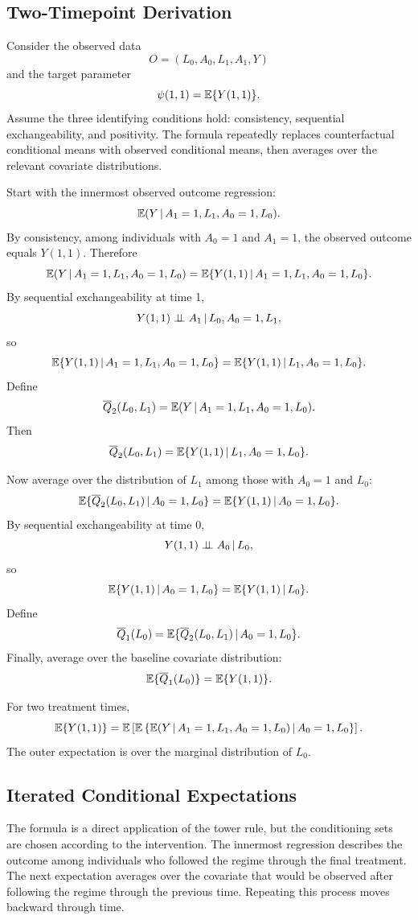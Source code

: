 \label{lec:8-3}

\subsection{Two-Timepoint Derivation}

Consider the observed data
\[
  O=(L_0,A_0,L_1,A_1,Y)
\]
and the target parameter
\[
  \psi(1,1)=\mathbb{E}\{Y(1,1)\}.
\]
Assume the three identifying conditions hold: consistency, sequential
exchangeability, and positivity. The formula repeatedly replaces counterfactual
conditional means with observed conditional means, then averages over the
relevant covariate distributions.

Start with the innermost observed outcome regression:
\[
  \mathbb{E}(Y\,\vert\, A_1=1,L_1,A_0=1,L_0).
\]
By consistency, among individuals with $A_0=1$ and $A_1=1$, the observed outcome
equals $Y(1,1)$. Therefore
\[
  \mathbb{E}(Y\,\vert\, A_1=1,L_1,A_0=1,L_0)
  =
  \mathbb{E}\{Y(1,1)\,\vert\, A_1=1,L_1,A_0=1,L_0\}.
\]
By sequential exchangeability at time 1,
\[
  Y(1,1)\perp\!\!\!\perp A_1\,\vert\, L_0,A_0=1,L_1,
\]
so
\[
  \mathbb{E}\{Y(1,1)\,\vert\, A_1=1,L_1,A_0=1,L_0\}
  =
  \mathbb{E}\{Y(1,1)\,\vert\, L_1,A_0=1,L_0\}.
\]
Define
\[
  \overline{Q}_2(L_0,L_1)
  =
  \mathbb{E}(Y\,\vert\, A_1=1,L_1,A_0=1,L_0).
\]
Then
\[
  \overline{Q}_2(L_0,L_1)
  =
  \mathbb{E}\{Y(1,1)\,\vert\, L_1,A_0=1,L_0\}.
\]

Now average over the distribution of $L_1$ among those with $A_0=1$ and $L_0$:
\[
  \mathbb{E}\{\overline{Q}_2(L_0,L_1)\,\vert\, A_0=1,L_0\}
  =
  \mathbb{E}\{Y(1,1)\,\vert\, A_0=1,L_0\}.
\]
By sequential exchangeability at time 0,
\[
  Y(1,1)\perp\!\!\!\perp A_0\,\vert\, L_0,
\]
so
\[
  \mathbb{E}\{Y(1,1)\,\vert\, A_0=1,L_0\}
  =
  \mathbb{E}\{Y(1,1)\,\vert\, L_0\}.
\]
Define
\[
  \overline{Q}_1(L_0)=\mathbb{E}\{\overline{Q}_2(L_0,L_1)\,\vert\, A_0=1,L_0\}.
\]
Finally, average over the baseline covariate distribution:
\[
  \mathbb{E}\{\overline{Q}_1(L_0)\}
  =
  \mathbb{E}\{Y(1,1)\}.
\]

\begin{identificationbox}
For two treatment times,
\[
  \mathbb{E}\{Y(1,1)\}
  =
  \mathbb{E}\left[
    \mathbb{E}\left\{
      \mathbb{E}(Y\,\vert\, A_1=1,L_1,A_0=1,L_0)
      \,\vert\, A_0=1,L_0
    \right\}
  \right].
\]
The outer expectation is over the marginal distribution of $L_0$.
\end{identificationbox}

\subsection{Iterated Conditional Expectations}

The formula is a direct application of the tower rule, but the conditioning sets
are chosen according to the intervention. The innermost regression describes the
outcome among individuals who followed the regime through the final treatment.
The next expectation averages over the covariate that would be observed after
following the regime through the previous time. Repeating this process moves
backward through time.

